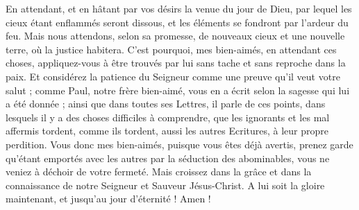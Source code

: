 \begin{multicols}{2}
En attendant, et en hâtant par vos désirs la venue du jour de Dieu, par lequel les cieux étant enflammés seront dissous, et les éléments se fondront par l'ardeur du feu.
Mais nous attendons, selon sa promesse, de nouveaux cieux et une nouvelle terre, où la justice habitera.
C'est pourquoi, mes bien-aimés, en attendant ces choses, appliquez-vous à être trouvés par lui sans tache et sans reproche dans la paix.
Et considérez la patience du Seigneur comme une preuve qu’il veut votre salut ; comme Paul, notre frère bien-aimé, vous en a écrit selon la sagesse qui lui a été donnée ;
ainsi que dans toutes ses Lettres, il parle de ces points, dans lesquels il y a des choses difficiles à comprendre, que les ignorants et les mal affermis tordent, comme ils tordent, aussi les autres Ecritures, à leur propre perdition.
Vous donc mes bien-aimés, puisque vous êtes déjà avertis, prenez garde qu'étant emportés avec les autres par la séduction des abominables, vous ne veniez à déchoir de votre fermeté.
Mais croissez dans la grâce et dans la connaissance de notre Seigneur et Sauveur Jésus-Christ. A lui soit la gloire maintenant, et jusqu'au jour d'éternité ! Amen !
\PPE{}
\end{multicols}
